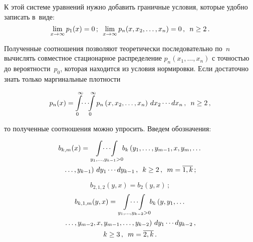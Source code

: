\begin{multicols}{2}
\noindent
К этой системе уравнений нужно добавить граничные условия,
которые удобно записать в~виде:
\begin{equation*}
\lim\limits_{x\to \infty} p_{1}(x) = 0\,;                         %
\enskip
\lim\limits_{x\to \infty} p_{n}(x,x_2,\ld,x_n) =
0\,,\enskip n\ge 2\,.               %
\end{equation*}

\noindent
Полученные соотношения позволяют теоретически последовательно по~$n$
вычислять совместное стационарное распределение $p_n(x_1,\ldots,x_{n})$
с точностью до вероятности~$p_0$, которая находится из условия нормировки.
Если достаточно знать только маргинальные плотности

\vspace*{2pt}

\noindent
\begin{equation*}
p_n(x) = \int\limits_0^\infty\!\! \cdots\!\! \int\limits_0^\infty
p_n\left(x,x_2,\ldots,x_n\right)\, dx_2\cdots dx_n\,,
\enskip n\ge 2\,,
\end{equation*}

\noindent то полученные соотношения можно упросить.
Введем обозначения:

\vspace*{-2pt}

\noindent
\begin{multline}
\label{new6}
b_{k,m}(x)
= \mathop{\int\!\cdots\!\int} \limits_{y_1,\ldots,y_{k-1}>0}\!\!
b_k\left(y_1,\ldots,y_{m-1},x,y_{m},\ldots\right.\\
\left.\ldots,y_{k-1}\right)\, dy_1\cdots dy_{k-1}\,,
\enskip k\ge 2\,,\enskip m=\overline{1,k}\,;
\end{multline}

\noindent
\begin{equation}
\label{new7-1}
b_{2,1,2}(y,x) = b_2(y,x)\,;
\end{equation}
\begin{multline}
\label{new7}
b_{k,1,m}(y,x)
=  \mathop{\int\!\cdots\!\int}
\limits_{y_1,\ldots,y_{k-2}>0}\!\!
b_k\left(y,y_1,\ldots\right.\\
\left.\ldots,y_{m-2},x,y_{m-1},\ldots,y_{k-2}\right)
\, dy_1\cdots dy_{k-2}\,,\\
k\ge 3\,,\enskip m=\overline{2,k}\,.
\end{multline}


\end{multicols}
